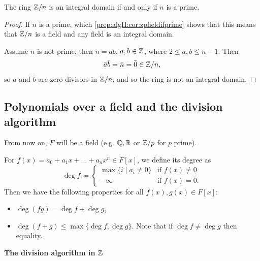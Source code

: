 \documentclass[10pt, a4paper]{article}
\begin{document}
\begin{proposition}
    The ring $\mathbb{Z} / n$ is an integral domain if and only if $n$ is a prime.

    \begin{proof}
        If $n$ is a prime,
        which \autoref{prep:algII:cor:zpfieldifprime} shows that this means that $\mathbb{Z} / n$ is a field and any field is an integral domain.

        Assume $n$ is not prime,
        then $n = ab$,
        $a, b \in \mathbb{Z}$,
        where $2 \leq a, b \leq n - 1$.
        Then
        \[
        \bar{a}\bar{b} = \bar{n} = \bar{0} \in \mathbb{Z} / n,
        \]
        so $\bar{a}$ and $\bar{b}$ are zero divisors in $\mathbb{Z} / n$,
        and so the ring is not an integral domain.
    \end{proof}
\end{proposition}

\subsection{Polynomials over a field and the division algorithm}
From now on,
$F$ will be a field
(e.g. $\mathbb{Q}, \mathbb{R}$ or $\mathbb{Z} / p$ for $p$ prime).

For $f(x) = a_0 + a_1x + \dotsc + a_nx ^ n \in F[x]$,
we define its degree as
\[
\deg{f} \coloneqq \begin{cases}
    \max\{i\mid a_i \neq 0\} &\text{if } f(x) \neq 0 \\
    -\infty &\text{if } f(x) = 0.
\end{cases}
\]
Then we have the following properties for all $f(x), g(x) \in F[x]$:
\begin{itemize}
    \item $\deg(fg) = \deg{f} + \deg{g}$,
    \item $\deg(f + g) \leq \max\{\deg{f}, \deg{g}\}$.
    Note that if $\deg{f} \neq \deg{g}$ then equality.
\end{itemize}


\textbf{The division algorithm in} $\mathbb{Z}$
\end{document}
